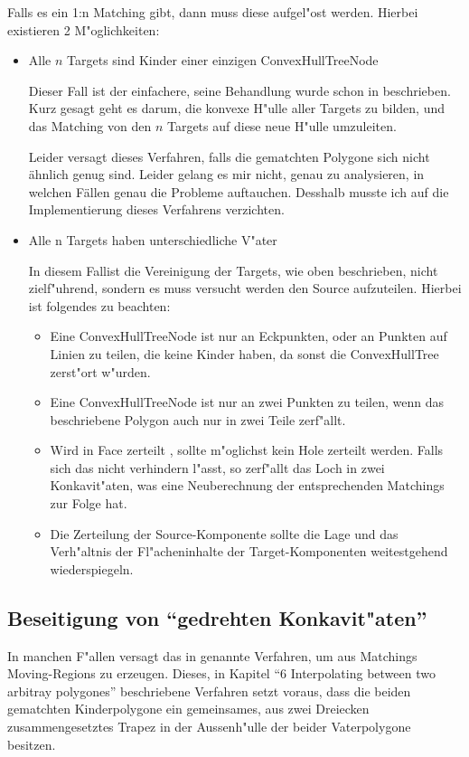 Falls es ein 1:n Matching gibt, dann muss diese aufgel"ost werden. Hierbei existieren 2 M"oglichkeiten:
\begin{itemize}
\item Alle $n$ Targets sind Kinder einer einzigen ConvexHullTreeNode

Dieser Fall ist der einfachere, seine Behandlung wurde schon in \cite{TG} beschrieben. Kurz gesagt geht es darum, die konvexe H"ulle aller Targets zu bilden, und das Matching von den $n$ Targets auf diese neue H"ulle umzuleiten.

Leider versagt dieses Verfahren, falls die gematchten Polygone sich nicht ähnlich genug sind. Leider gelang es mir nicht, genau zu analysieren, in welchen Fällen genau die Probleme auftauchen. Desshalb musste ich auf die Implementierung dieses Verfahrens verzichten.

\item Alle n Targets haben unterschiedliche V"ater

In diesem Fallist die Vereinigung der Targets, wie oben beschrieben, nicht zielf"uhrend, sondern es muss versucht werden den Source aufzuteilen. Hierbei ist folgendes zu beachten:
\begin{itemize}
\item Eine ConvexHullTreeNode ist nur an Eckpunkten, oder an Punkten auf Linien zu teilen, die keine Kinder haben, da sonst die ConvexHullTree zerst"ort w"urden.

\item Eine ConvexHullTreeNode ist nur an zwei Punkten zu teilen, wenn das beschriebene Polygon auch nur in zwei Teile zerf"allt.
\item Wird in Face zerteilt , sollte m"oglichst kein Hole zerteilt werden. Falls sich das nicht verhindern l"asst, so zerf"allt das Loch in zwei Konkavit"aten, was eine Neuberechnung der entsprechenden Matchings zur Folge hat.

\item Die Zerteilung der Source-Komponente sollte die Lage und das Verh"altnis der Fl"acheninhalte der Target-Komponenten weitestgehend wiederspiegeln.

\end{itemize} 
\end{itemize} 
\subsection{Beseitigung von "`gedrehten Konkavit"aten"'}
In manchen F"allen versagt das in \cite{TG} genannte Verfahren, um aus Matchings Moving-Regions zu erzeugen. Dieses, in Kapitel "`6 Interpolating between two arbitray polygones"' beschriebene Verfahren setzt voraus, dass die beiden gematchten Kinderpolygone ein gemeinsames, aus zwei Dreiecken zusammengesetztes Trapez in der Aussenh"ulle der beider Vaterpolygone besitzen. 

